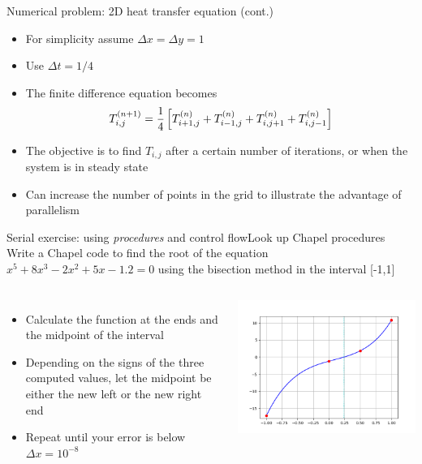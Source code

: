 \documentclass[10pt,xcolor=pdftex,dvipsnames,table]{beamer}
\begin{document}
\begin{frame}{Numerical problem: 2D heat transfer equation (cont.)}
  \begin{itemize}\setlength{\itemsep}{3mm}
    \item For simplicity assume $\Delta x=\Delta y=1$
    \item Use $\Delta t=1/4$
    \item The finite difference equation becomes
    \[
      T^{(n+1)}_{i,j} = {1\over4}\left[T^{(n)}_{i+1,j}+T^{(n)}_{i-1,j}+T^{(n)}_{i,j+1}+T^{(n)}_{i,j-1}\right]
    \]
    \item The objective is to find $T_{i,j}$ after a certain number of iterations, or when the system is
      in steady state
    \item Can increase the number of points in the grid to illustrate the advantage of parallelism
  \end{itemize}
\end{frame}

\begin{frame}{Serial exercise: using {\it procedures} and control flow}{Look up Chapel procedures}
  Write a Chapel code to find the root of the equation $x^5 + 8x^3 - 2x^2 + 5x - 1.2 = 0$ using the bisection
  method in the interval [-1,1]
  \begin{columns}[]
    \begin{itemize}\setlength{\itemsep}{3mm}
      \item Calculate the function at the ends and the midpoint of the interval
      \item Depending on the signs of the three computed values, let the midpoint be either the new left
      or the new right end
      \item Repeat until your error is below $\Delta x=10^{-8}$
    \end{itemize}
    \includegraphics[width=0.95\columnwidth]{figs/bisection.png}
  \end{columns}
\end{frame}
\end{document}
